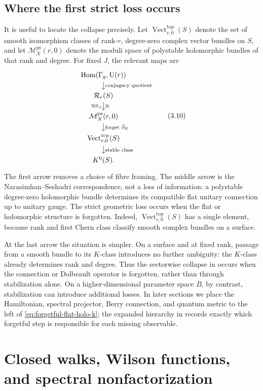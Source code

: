 \documentclass[11pt]{article}
\theoremstyle{definition}
\theoremstyle{remark}
\newcommand{\UU}{\mathrm U}
\newcommand{\Hom}{\operatorname{Hom}}
\newcommand{\cR}{\mathcal R}
\newcommand{\cM}{\mathcal M}
\begin{document}
\subsection{Where the first strict loss occurs}

It is useful to locate the collapse precisely.  Let
\(\operatorname{Vect}^{\mathrm{top}}_{r,0}(S)\) denote the set of smooth
isomorphism classes of rank-\(r\), degree-zero complex vector bundles on
\(S\), and let \(\cM_X^{\mathrm{ps}}(r,0)\) denote the moduli space of
polystable holomorphic bundles of that rank and degree.  For fixed \(J\), the
relevant maps are
\[
\begin{tikzcd}[row sep=1.15em]
\Hom(\Gamma_g,\UU(r))
  \arrow[d, "\text{conjugacy quotient}"]\\
\cR_r(S)
  \arrow[d, "\mathrm{NS}_J"', "\cong"]\\
\cM_X^{\mathrm{ps}}(r,0)
  \arrow[d, "\text{forget }\bar\partial_E"]\\
\operatorname{Vect}^{\mathrm{top}}_{r,0}(S)
  \arrow[d, "\text{stable class}"]\\
K^0(S).
\end{tikzcd}
\tag{3.10}\label{eq:forgetful-flat-holo-k}
\]
The first arrow removes a choice of fibre framing.  The middle arrow is the
Narasimhan--Seshadri correspondence, not a loss of information: a polystable
degree-zero holomorphic bundle determines its compatible flat unitary
connection up to unitary gauge.  The strict geometric loss occurs when the
flat or holomorphic structure is forgotten.  Indeed,
\(\operatorname{Vect}^{\mathrm{top}}_{r,0}(S)\) has a single element, because
rank and first Chern class classify smooth complex bundles on a surface.

At the last arrow the situation is simpler.  On a surface and at fixed rank,
passage from a smooth bundle to its \(K\)-class introduces no further
ambiguity: the \(K\)-class already determines rank and degree.  Thus the
sectorwise collapse in  occurs when the connection or
Dolbeault operator is forgotten, rather than through stabilization alone.  On
a higher-dimensional parameter space \(B\), by contrast, stabilization can
introduce additional losses.  In later sections we place the Hamiltonian,
spectral projector, Berry connection, and quantum metric to the left of
\eqref{eq:forgetful-flat-holo-k}; the expanded hierarchy in
 records exactly which forgetful step is responsible for
each missing observable.

\section{Closed walks, Wilson functions, and spectral nonfactorization}
\label{sec:walks}
\end{document}
